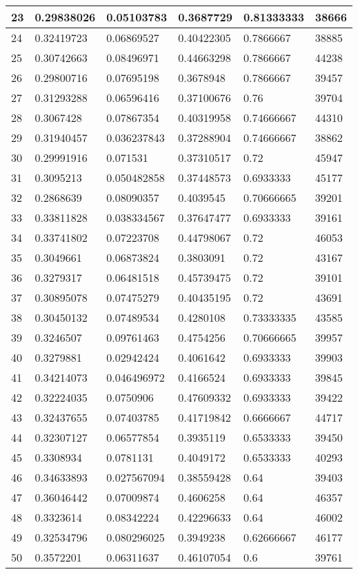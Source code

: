 \begin{longtable}{|l|l|l|l|l|l|}
23 & 0.29838026 & 0.05103783 & 0.3687729 & 0.81333333 & 38666 \\ \hline 
24 & 0.32419723 & 0.06869527 & 0.40422305 & 0.7866667 & 38885 \\ \hline 
25 & 0.30742663 & 0.08496971 & 0.44663298 & 0.7866667 & 44238 \\ \hline 
26 & 0.29800716 & 0.07695198 & 0.3678948 & 0.7866667 & 39457 \\ \hline 
27 & 0.31293288 & 0.06596416 & 0.37100676 & 0.76 & 39704 \\ \hline 
28 & 0.3067428 & 0.07867354 & 0.40319958 & 0.74666667 & 44310 \\ \hline 
29 & 0.31940457 & 0.036237843 & 0.37288904 & 0.74666667 & 38862 \\ \hline 
30 & 0.29991916 & 0.071531 & 0.37310517 & 0.72 & 45947 \\ \hline 
31 & 0.3095213 & 0.050482858 & 0.37448573 & 0.6933333 & 45177 \\ \hline 
32 & 0.2868639 & 0.08090357 & 0.4039545 & 0.70666665 & 39201 \\ \hline 
33 & 0.33811828 & 0.038334567 & 0.37647477 & 0.6933333 & 39161 \\ \hline 
34 & 0.33741802 & 0.07223708 & 0.44798067 & 0.72 & 46053 \\ \hline 
35 & 0.3049661 & 0.06873824 & 0.3803091 & 0.72 & 43167 \\ \hline 
36 & 0.3279317 & 0.06481518 & 0.45739475 & 0.72 & 39101 \\ \hline 
37 & 0.30895078 & 0.07475279 & 0.40435195 & 0.72 & 43691 \\ \hline 
38 & 0.30450132 & 0.07489534 & 0.4280108 & 0.73333335 & 43585 \\ \hline 
39 & 0.3246507 & 0.09761463 & 0.4754256 & 0.70666665 & 39957 \\ \hline 
40 & 0.3279881 & 0.02942424 & 0.4061642 & 0.6933333 & 39903 \\ \hline 
41 & 0.34214073 & 0.046496972 & 0.4166524 & 0.6933333 & 39845 \\ \hline 
42 & 0.32224035 & 0.0750906 & 0.47609332 & 0.6933333 & 39422 \\ \hline 
43 & 0.32437655 & 0.07403785 & 0.41719842 & 0.6666667 & 44717 \\ \hline 
44 & 0.32307127 & 0.06577854 & 0.3935119 & 0.6533333 & 39450 \\ \hline 
45 & 0.3308934 & 0.0781131 & 0.4049172 & 0.6533333 & 40293 \\ \hline 
46 & 0.34633893 & 0.027567094 & 0.38559428 & 0.64 & 39403 \\ \hline 
47 & 0.36046442 & 0.07009874 & 0.4606258 & 0.64 & 46357 \\ \hline 
48 & 0.3323614 & 0.08342224 & 0.42296633 & 0.64 & 46002 \\ \hline 
49 & 0.32534796 & 0.080296025 & 0.3949238 & 0.62666667 & 46177 \\ \hline 
50 & 0.3572201 & 0.06311637 & 0.46107054 & 0.6 & 39761 \\ \hline 
\end{longtable}